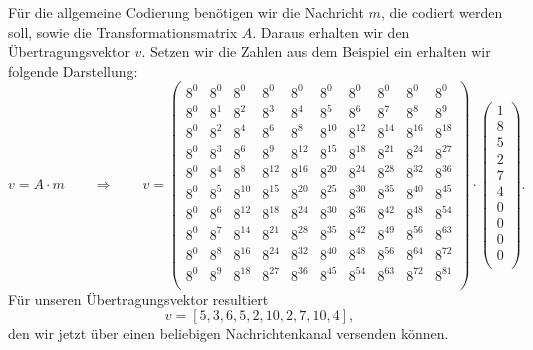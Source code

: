 Für die allgemeine Codierung benötigen wir die Nachricht $m$, die codiert werden soll, sowie die Transformationsmatrix $A$. Daraus erhalten wir den Übertragungsvektor $v$. Setzen wir die Zahlen aus dem Beispiel ein erhalten wir folgende Darstellung:
\[
v = A \cdot m \qquad \Rightarrow \qquad v = \begin{pmatrix}
	8^0&    8^0&    8^0&    8^0&    8^0&    8^0&    8^0&    8^0&    8^0&    8^0\\
	8^0&	8^1&	8^2&	8^3&	8^4&	8^5&	8^6&	8^7&    8^8&	8^9\\
	8^0&	8^2&	8^4&	8^6&	8^8& 8^{10}& 8^{12}& 8^{14}& 8^{16}& 8^{18}\\
	8^0&	8^3&	8^6&	8^9& 8^{12}& 8^{15}& 8^{18}& 8^{21}& 8^{24}& 8^{27}\\
	8^0&	8^4&	8^8& 8^{12}& 8^{16}& 8^{20}& 8^{24}& 8^{28}& 8^{32}& 8^{36}\\
	8^0&	8^5& 8^{10}& 8^{15}& 8^{20}& 8^{25}& 8^{30}& 8^{35}& 8^{40}& 8^{45}\\
	8^0&	8^6& 8^{12}& 8^{18}& 8^{24}& 8^{30}& 8^{36}& 8^{42}& 8^{48}& 8^{54}\\
	8^0&	8^7& 8^{14}& 8^{21}& 8^{28}& 8^{35}& 8^{42}& 8^{49}& 8^{56}& 8^{63}\\
	8^0&	8^8& 8^{16}& 8^{24}& 8^{32}& 8^{40}& 8^{48}& 8^{56}& 8^{64}& 8^{72}\\
	8^0&	8^9& 8^{18}& 8^{27}& 8^{36}& 8^{45}& 8^{54}& 8^{63}& 8^{72}& 8^{81}\\
\end{pmatrix}
\cdot
\begin{pmatrix}
	1 \\ 8 \\ 5 \\ 2 \\ 7 \\ 4 \\ 0 \\ 0 \\ 0 \\ 0 \\
\end{pmatrix}
.
\]
Für unseren Übertragungsvektor resultiert
\[
v = [5,3,6,5,2,10,2,7,10,4],
\]
den wir jetzt über einen beliebigen Nachrichtenkanal versenden können.
